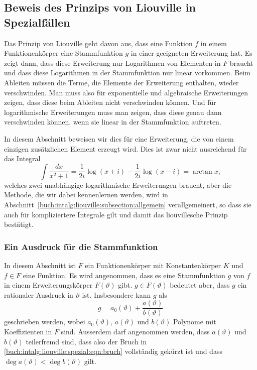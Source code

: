 %
%
\subsection{Beweis des Prinzips von Liouville in Spezialfällen
\label{buch:intalg:liouville:subsection:spezialfaelle}}
Das Prinzip von Liouville geht davon aus, dass eine Funktion $f$
in einem Funktionenkörper eine Stammfunktion $g$ in einer geeigneten
Erweiterung hat.
Es zeigt dann, dass diese Erweiterung nur Logarithmen von Elementen
in $F$ braucht und dass diese Logarithmen in der Stammfunktion nur 
linear vorkommen.
Beim Ableiten müssen die Terme, die Elemente der Erweiterung enthalten,
wieder verschwinden.
Man muss also für exponentielle und algebraische Erweiterungen zeigen,
dass diese beim Ableiten nicht verschwinden können.
Und für logarithmische Erweiterungen muss man zeigen, dass diese genau
dann verschwinden können, wenn sie linear in der Stammfunktion auftreten.

In diesem Abschnitt beweisen wir dies für eine Erweiterung, die von einem
einzigen zusätzlichen Element erzeugt wird.
Dies ist zwar nicht ausreichend für das Integral
\[
\int \frac{dx}{x^2+1}
=
\frac{1}{2i}\log(x+i)
-
\frac{1}{2i}\log(x-i)
=
\arctan x,
\]
welches zwei unabhängige logarithmische Erweiterungen braucht, aber
die Methode, die wir dabei kennenlernen werden, wird in
Abschnitt~\ref{buch:intalg:liouville:subsection:allgemein}
verallgemeinert, so dass sie auch für kompliziertere Integrale
gilt und damit das liouvillesche Prinzip bestätigt.

%
%
\subsubsection{Ein Ausdruck für die Stammfunktion}
In diesem Abschnitt ist $F$ ein Funktionenkörper mit Konstantenkörper
$K$ und $f\in F$ eine Funktion.
Es wird angenommen, dass es eine Stammfunktion $g$ von $f$ in einem
Erweiterungskörper $F(\vartheta)$ gibt.
$g\in F(\vartheta)$ bedeutet aber, dass $g$ ein rationaler Ausdruck
in $\vartheta$ ist.
Insbesondere kann $g$ als
\begin{equation}
g
=
a_0(\vartheta)
+
\frac{a(\vartheta)}{b(\vartheta)}
\label{buch:intalg:liouville:spezial:eqn:bruch}
\end{equation}
geschrieben werden, wobei $a_0(\vartheta)$, $a(\vartheta)$ und $b(\vartheta)$
Polynome mit Koeffizienten in $F$ sind.
Ausserdem darf angenommen werden, dass $a(\vartheta)$ und $b(\vartheta)$
teilerfremd sind, dass also der Bruch in
\eqref{buch:intalg:liouville:spezial:eqn:bruch}
vollständig gekürzt ist und dass
$\deg a(\vartheta)<\deg b(\vartheta)$ gilt.

